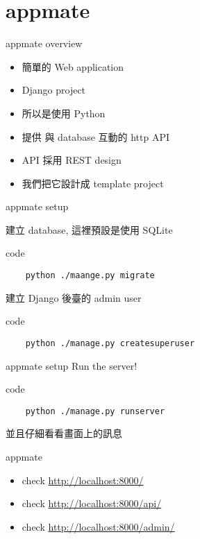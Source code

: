 \documentclass{beamer}
\begin{document}
\section{appmate}

\begin{frame}{appmate overview}
  \Large

  \begin{itemize}
    \item 簡單的 Web application

    \item Django project

    \item 所以是使用 Python

    \item 提供 與 database 互動的 http API

    \item API 採用 REST design

    \item 我們把它設計成 template project
  \end{itemize}
\end{frame}

\begin{frame}[fragile]{appmate setup}

  建立 database, 這裡預設是使用 SQLite
  \begin{block}{code}
  \begin{verbatim}
    python ./maange.py migrate
  \end{verbatim}
  \end{block}

  建立 Django 後臺的 admin user
  \begin{block}{code}
  \begin{verbatim}
    python ./manage.py createsuperuser
  \end{verbatim}
  \end{block}
\end{frame}

\begin{frame}[fragile]{appmate setup}
  Run the server!
  \begin{block}{code}
  \begin{verbatim}
    python ./manage.py runserver
  \end{verbatim}
  \end{block}

  並且仔細看看畫面上的訊息
\end{frame}

\begin{frame}{appmate}
  \begin{itemize}
    \item check \url{http://localhost:8000/}

    \item check \url{http://localhost:8000/api/}

    \item check \url{http://localhost:8000/admin/}
  \end{itemize}
\end{frame}
\end{document}

